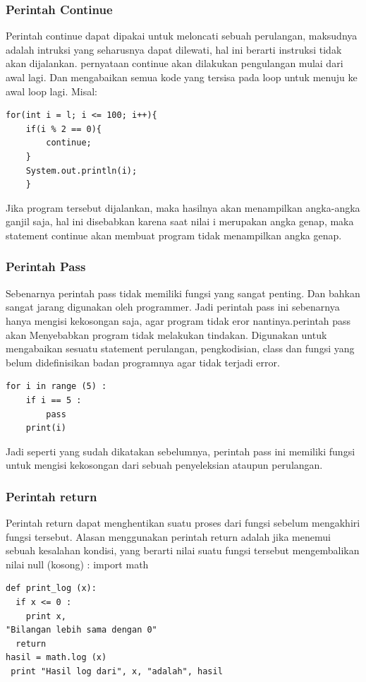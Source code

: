 \subsubsection{Perintah Continue}
Perintah continue dapat dipakai untuk meloncati sebuah perulangan, maksudnya adalah intruksi yang seharusnya dapat dilewati, hal ini berarti instruksi tidak akan dijalankan\cite{arfian2012rekayasa}. pernyataan continue akan dilakukan pengulangan mulai dari awal lagi. Dan mengabaikan semua kode yang tersisa pada loop untuk menuju ke awal loop lagi.
Misal:
\begin{verbatim}
for(int i = l; i <= 100; i++){
    if(i % 2 == 0){
        continue;
    }
    System.out.println(i);
    }
\end{verbatim}

Jika program tersebut dijalankan, maka hasilnya akan menampilkan angka-angka ganjil saja, hal ini disebabkan karena saat nilai i merupakan angka genap, maka statement continue akan membuat program tidak menampilkan angka genap.

\subsubsection{Perintah Pass}
Sebenarnya perintah pass tidak memiliki fungsi yang sangat penting. Dan bahkan sangat jarang digunakan oleh programmer. Jadi perintah pass ini sebenarnya hanya mengisi kekosongan saja, agar program tidak eror nantinya.perintah pass akan Menyebabkan program tidak melakukan tindakan. Digunakan untuk mengabaikan sesuatu statement perulangan, pengkodisian, class dan fungsi yang belum didefinisikan badan programnya agar tidak terjadi error.
\begin{verbatim}
for i in range (5) :
    if i == 5 :
        pass
    print(i)
    \end{verbatim}

Jadi seperti yang sudah dikatakan sebelumnya, perintah pass ini memiliki fungsi untuk mengisi kekosongan dari sebuah penyeleksian ataupun perulangan.

 \subsubsection{Perintah return}
Perintah return dapat menghentikan suatu proses dari fungsi sebelum mengakhiri fungsi tersebut. Alasan menggunakan perintah return adalah jika menemui sebuah kesalahan kondisi, yang berarti nilai suatu fungsi tersebut mengembalikan nilai null (kosong) : 
import math
\begin{verbatim}
def print_log (x):
  if x <= 0 :
    print x, 
"Bilangan lebih sama dengan 0"  
  return  
hasil = math.log (x) 
 print "Hasil log dari", x, "adalah", hasil 
 \end{verbatim}
 
